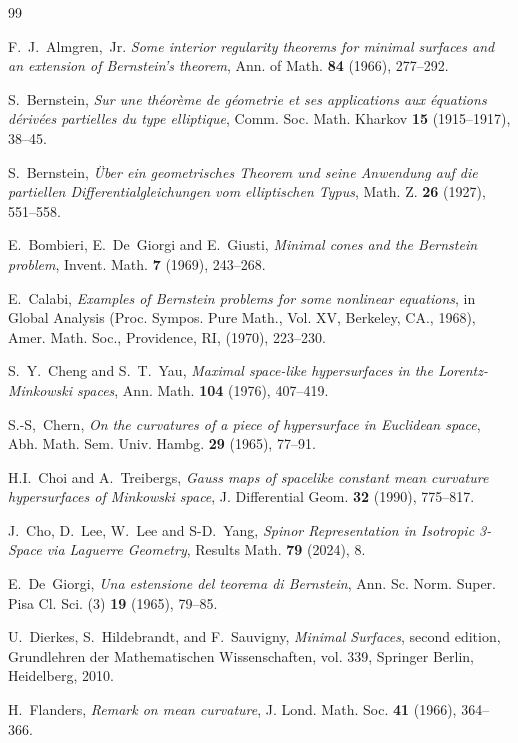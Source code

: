 \documentclass[12pt,a4paper,reqno]{amsart}
\theoremstyle{plain} %
\theoremstyle{definition}
\begin{document}
\begin{thebibliography}{99}

F.~J.~Almgren,~Jr. {\it Some interior regularity theorems for minimal surfaces and an extension of Bernstein’s theorem}, Ann. of Math. {\bf 84} (1966), 277--292.

S.~Bernstein, {\it Sur une th\'eor\`eme de g\'eometrie et ses applications aux \'equations d\'eriv\'ees partielles du type elliptique}, Comm. Soc. Math. Kharkov {\bf 15} (1915--1917), 38--45.

S.~Bernstein, {\it \"Uber ein geometrisches Theorem und seine Anwendung auf die partiellen Diﬀerentialgleichungen vom elliptischen Typus}, Math. Z. {\bf 26} (1927), 551--558.
 
 E.~Bombieri, E.~De~Giorgi and E.~Giusti, {\it Minimal cones and the Bernstein problem}, Invent. Math. {\bf 7} (1969), 243--268.

E.~Calabi, {\it Examples of Bernstein problems for some nonlinear equations}, in Global Analysis (Proc. Sympos. Pure Math., Vol. XV, Berkeley, CA., 1968), Amer. Math. Soc., Providence, RI, (1970), 223--230.

S.~Y.~Cheng and S.~T.~Yau,  {\it Maximal space-like hypersurfaces in the Lorentz-Minkowski spaces}, Ann. Math. {\bf 104} (1976), 407--419.

S.-S,~Chern,  {\it On the curvatures of a piece of hypersurface in Euclidean space}, Abh. Math. Sem. Univ. Hambg. {\bf 29} (1965), 77--91.

H.I.~Choi and A.~Treibergs, {\it Gauss maps of spacelike constant mean curvature hypersurfaces of Minkowski space}, J. Differential Geom. {\bf 32} (1990), 775--817.
              
J.~Cho, D.~Lee, W.~Lee and S-D.~Yang, {\it Spinor Representation in Isotropic 3-Space via Laguerre Geometry}, Results Math. {\bf 79} (2024), 8.

E.~De~Giorgi, {\it Una estensione del teorema di Bernstein}, Ann. Sc. Norm. Super. Pisa Cl. Sci. (3) {\bf 19} (1965), 79--85.

 U.~Dierkes, S.~Hildebrandt, and F.~Sauvigny, {\it Minimal Surfaces}, second edition, Grundlehren der Mathematischen Wissenschaften, vol. 339, Springer Berlin, Heidelberg, 2010. 

H.~Flanders, {\it Remark on mean curvature}, J. Lond. Math. Soc. {\bf 41} (1966), 364--366.


\end{thebibliography}
\end{document}
